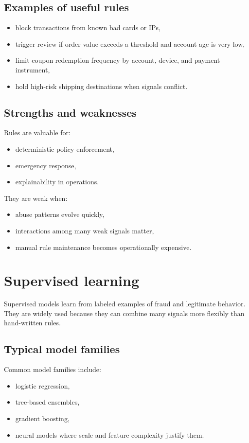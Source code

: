 \subsection{Examples of useful rules}
\begin{itemize}
  \item block transactions from known bad cards or IPs,
  \item trigger review if order value exceeds a threshold and account age is very low,
  \item limit coupon redemption frequency by account, device, and payment instrument,
  \item hold high-risk shipping destinations when signals conflict.
\end{itemize}

\subsection{Strengths and weaknesses}
Rules are valuable for:
\begin{itemize}
  \item deterministic policy enforcement,
  \item emergency response,
  \item explainability in operations.
\end{itemize}

They are weak when:
\begin{itemize}
  \item abuse patterns evolve quickly,
  \item interactions among many weak signals matter,
  \item manual rule maintenance becomes operationally expensive.
\end{itemize}

\section{Supervised learning}
Supervised models learn from labeled examples of fraud and legitimate behavior.
They are widely used because they can combine many signals more flexibly than hand-written rules.

\subsection{Typical model families}
Common model families include:
\begin{itemize}
  \item logistic regression,
  \item tree-based ensembles,
  \item gradient boosting,
  \item neural models where scale and feature complexity justify them.
\end{itemize}

